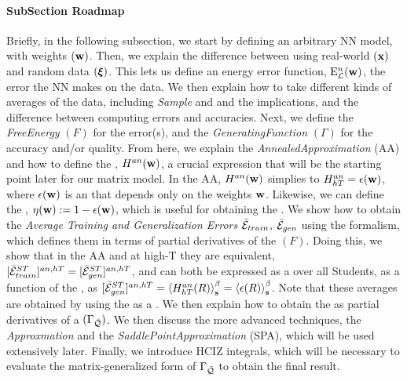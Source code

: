 \paragraph{SubSection Roadmap}
Briefly, in the following subsection,
we start by defining an arbitrary NN model, with weights $({\mathbf{w}})$.
Then, we explain the difference between using real-world $({\mathbf{x}})$ and random data $(\boldsymbol{\xi})$.
This lets us define an energy error function, $\mathbf{\mathrm{E}}^{n}_{\mathcal{L}}(\mathbf{w})$,
the error the NN makes on the data.
We then explain how to take different kinds of \emph{\Thermodynamic} averages of the data,
including \emph{Sample} and \emph{\ThermalAverages} and the implications,
and the difference between computing errors and accuracies.
Next, we define the \emph{FreeEnergy} $(F)$ for the error(s), and the \emph{GeneratingFunction}  $(\Gamma)$
for the accuracy and/or quality.
From here, we explain the \emph{AnnealedApproximation} (AA) and
how to define the  \emph{\AnnealedHamiltonian}, $H^{an}({\mathbf{w}})$, a crucial expression
that will be the starting point later for our matrix model.
In the AA, $H^{an}({\mathbf{w}})$ simplies to  $H^{an}_{hT}=\epsilon({\mathbf{w}})$, where $\epsilon({\mathbf{w}})$ is an \EffectivePotential
that depends only on the weights ${\mathbf{w}}$.
Likewise, we can define the \SelfOverlap, $\eta({\mathbf{w}}):=1-\epsilon({\mathbf{w}})$, which is useful for
obtaining the \Quality.
We show how to obtain the \emph{Average Training and Generalization Errors} $\bar{\mathcal{E}}_{train}$, $\bar{\mathcal{E}}_{gen}$
using the \STATMECH formalism, which defines them in terms of partial derivatives of the \FreeEnergy $(F)$.
Doing this, we show that in the AA and at high-T they are equivalent,
$[\bar{\mathcal{E}}^{ST}_{train}]^{an,hT}=[\bar{\mathcal{E}}^{ST}_{gen}]^{an,hT}$,
and can both be expressed as a \ThermalAverage over all Students, as a function 
of the \Teacher, as $[\bar{\mathcal{E}}^{ST}_{gen}]^{an,hT}=\left\langle H^{an}_{hT}(R) \right\rangle_{\mathbf s}^{\beta}=\left\langle \epsilon(R) \right\rangle_{\mathbf s}^{\beta}$.
Note that these averages are obtained by using the \FreeEnergy as a \GeneratingFunction.
We then explain how to obtain the \ModelQuality  as  partial derivatives of a
\emph{\GeneratingFunction} $(\Gamma_{\bar{\mathcal{Q}}})$.
We then discuss the more advanced techniques, the
\emph{\LargeN Approxmation} and the \emph{SaddlePointApproximation} (SPA),
which will be used extensively later.
Finally, we introduce  HCIZ integrals, which will be necessary to evaluate the matrix-generalized
form of $\Gamma_{\bar{\mathcal{Q}}}$ to obtain the final result.

